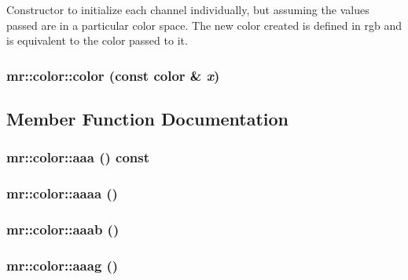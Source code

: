 Constructor to initialize each channel individually, but assuming the values passed are in a particular color space. The new color created is defined in rgb and is equivalent to the color passed to it. 
\subsubsection{\setlength{\rightskip}{0pt plus 5cm}mr::color::color (const {\bf color} \& {\em x})\hspace{0.3cm}{\tt  [inline]}}\label{structmr_1_1color_z2_0}




\subsection{Member Function Documentation}
\subsubsection{ mr::color::aaa () const\hspace{0.3cm}{\tt  [inline]}}\label{structmr_1_1color_z7_5}


\subsubsection{ mr::color::aaaa ()\hspace{0.3cm}{\tt  [inline]}}\label{structmr_1_1color_z7_62}


\subsubsection{ mr::color::aaab ()\hspace{0.3cm}{\tt  [inline]}}\label{structmr_1_1color_z7_220}


\subsubsection{ mr::color::aaag ()\hspace{0.3cm}{\tt  [inline]}}\label{structmr_1_1color_z7_219}


